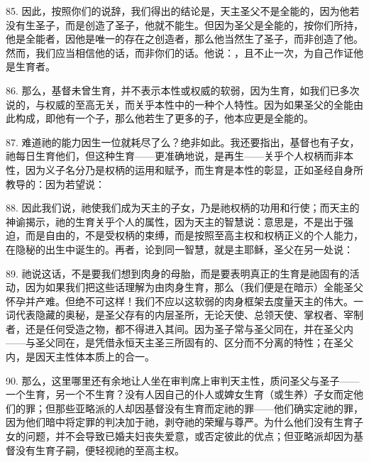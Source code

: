 85. 因此，按照你们的说辞，我们得出的结论是，天主圣父不是全能的，因为他若没有生圣子，而是创造了圣子，他就不能生。但因为圣父是全能的，按你们所持，他是全能者，因他是唯一的存在之创造者，那么他当然生了圣子，而非创造了他。然而，我们应当相信他的话，而非你们的话。他说：，且不止一次，为自己作证他是生育者。\par

86. 那么，基督未曾生育，并不表示本性或权威的软弱，因为生育，如我们已多次说的，与权威的至高无关，而关乎本性中的一种个人特性。因为如果圣父的全能由此构成，即他有一个子，那么他若生了更多的子，他本应更是全能的。\par

87. 难道祂的能力因生一位就耗尽了么？绝非如此。我还要指出，基督也有子女，祂每日生育他们，但这种生育——更准确地说，是再生——关乎个人权柄而非本性，因为义子名分乃是权柄的运用和赋予，而生育是本性的彰显，正如圣经自身所教导的：因为若望说：\par

88. 因此我们说，祂使我们成为天主的子女，乃是祂权柄的功用和行使；而天主的神谕揭示，祂的生育关乎个人的属性，因为天主的智慧说：意思是，不是出于强迫，而是自由的，不是受权柄的束缚，而是按照至高主权和权柄正义的个人能力，在隐秘的出生中诞生的。再者，论到同一智慧，就是主耶稣，圣父在另一处说：\par

89. 祂说这话，不是要我们想到肉身的母胎，而是要表明真正的生育是祂固有的活动，因为如果我们把这些话理解为由肉身生育，那么（我们便是在暗示）全能圣父怀孕并产难。但绝不可这样！我们不应以这软弱的肉身框架去度量天主的伟大。一词代表隐藏的奥秘，是圣父存有的内层圣所，无论天使、总领天使、掌权者、宰制者，还是任何受造之物，都不得进入其间。因为圣子常与圣父同在，并在圣父内——与圣父同在，是凭借永恒天主圣三所固有的、区分而不分离的特性；在圣父内，是因天主性体本质上的合一。\par

90. 那么，这里哪里还有余地让人坐在审判席上审判天主性，质问圣父与圣子——一个生育，另一个不生育？没有人因自己的仆人或婢女生育（或生养）子女而定他们的罪；但那些亚略派的人却因基督没有生育而定祂的罪——他们确实定祂的罪，因为他们暗中将定罪的判决加于祂，剥夺祂的荣耀与尊严。为什么他们没有生育子女的问题，并不会导致已婚夫妇丧失爱意，或否定彼此的优点；但亚略派却因为基督没有生育子嗣，便轻视祂的至高主权。\par

